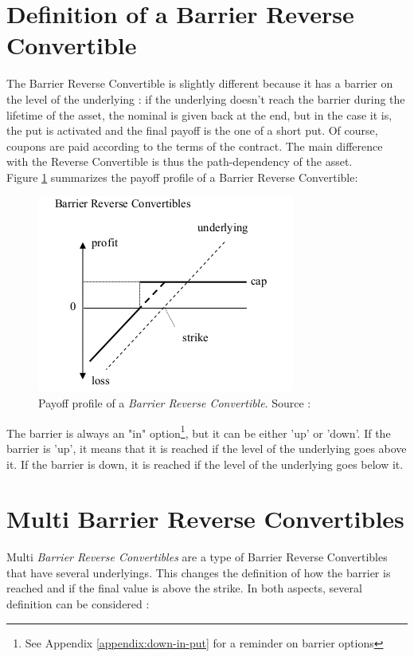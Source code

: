 \documentclass[a4paper,11pt,english]{book}
\begin{document}
\section{Definition of a Barrier Reverse Convertible}
\label{sec:BRC-definition}

The Barrier Reverse Convertible is slightly different because it has a barrier on the level of the underlying : if the underlying doesn't reach the barrier during the lifetime of the asset, the nominal is given back at the end, but in the case it is, the put is activated and the final payoff is the one of a short put. Of course, coupons are paid according to the terms of the contract. The main difference with the Reverse Convertible is thus the path-dependency of the asset. \\

Figure \ref{fig:BRC-payoff} summarizes the payoff profile of a Barrier Reverse Convertible:

\begin{figure}[!h]
    \centering
    \includegraphics[scale=0.65]{images/BRC.png}
    \caption{Payoff profile of a \textit{Barrier Reverse Convertible}. Source : \cite{lindauer2008pricing}}
    \label{fig:BRC-payoff}
\end{figure}

The barrier is always an "in" option\footnote{See Appendix \ref{appendix:down-in-put} for a reminder on barrier options}, but it can be either 'up' or 'down'. If the barrier is 'up', it means that it is reached if the level of the underlying goes above it. If the barrier is down, it is reached if the level of the underlying goes below it.

\section{Multi Barrier Reverse Convertibles}
\label{sec:multi-BRC-definition}
Multi \textit{Barrier Reverse Convertibles} are a type of Barrier Reverse Convertibles that have several underlyings. This changes the definition of how the barrier is reached and if the final value is above the strike. In both aspects, several definition can be considered :
\end{document}
